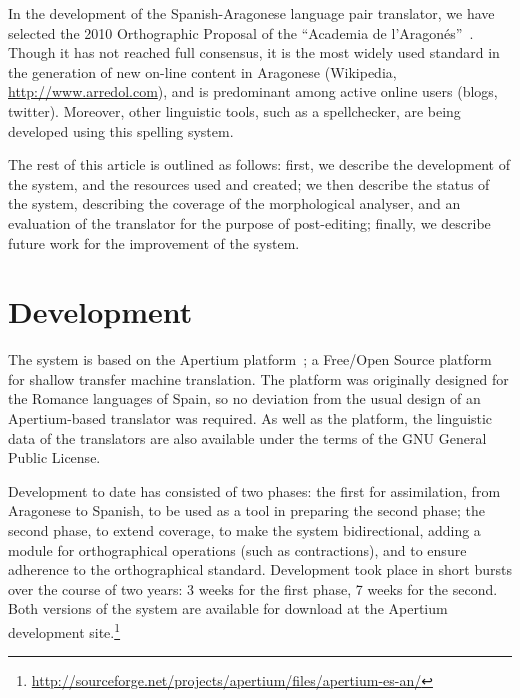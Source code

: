\documentclass[10pt, a4paper]{article}
\begin{document}
  In the development of the Spanish-Aragonese language pair translator, we have selected the 2010 Orthographic Proposal of the ``Academia de l'Aragonés''~\cite{EFA}. Though it has not reached full consensus, it is the most widely used standard in the generation of new on-line content in Aragonese (Wikipedia, \url{http://www.arredol.com}), and is predominant among active online users (blogs, twitter). Moreover, other linguistic tools, such as a spellchecker, are being developed using this spelling system. %
  
  The rest of this article is outlined as follows: first, we describe the development of the system, and the resources used and created; we then describe the status of the system, describing the coverage of the morphological analyser, and an evaluation of the translator for the purpose of post-editing; finally, we describe future work for the improvement of the system.
  
  \section{Development}
  
  The system is based on the Apertium platform~\cite{Forcada}; a Free/Open Source platform for shallow transfer machine translation. The platform was originally designed for the Romance languages of Spain, so no deviation from the usual design of an Apertium-based translator was required. As well as the platform, the linguistic data of the translators are also available under the terms of the GNU General Public License.
  
  Development to date has consisted of two phases: the first for assimilation, from Aragonese to Spanish, to be used as a tool in preparing the second phase; the second phase, to extend coverage, to make the system bidirectional, adding a module for orthographical operations (such as contractions), and to ensure adherence to the orthographical standard. Development took place in short bursts over the course of two years: 3 weeks for the first phase, 7 weeks for the second. Both versions of the system are available for download at the Apertium development site.\footnote{\url{http://sourceforge.net/projects/apertium/files/apertium-es-an/}}
\end{document}
